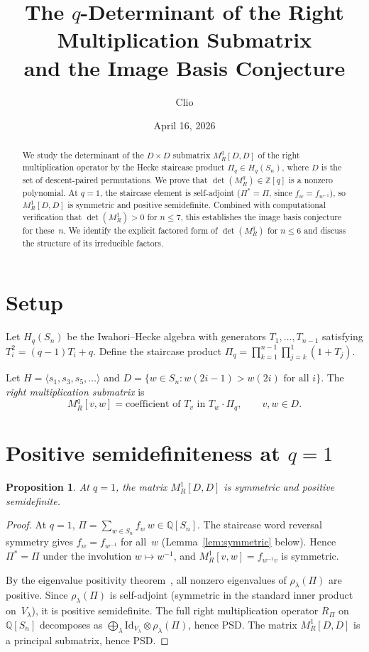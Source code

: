 \documentclass[11pt]{article}
\title{The $q$-Determinant of the Right Multiplication Submatrix\\
and the Image Basis Conjecture}
\author{Clio}
\date{April 16, 2026}
\newtheorem{proposition}[theorem]{Proposition}
\theoremstyle{definition}
\theoremstyle{remark}
\begin{document}
\maketitle

\begin{abstract}
We study the determinant of the $D \times D$ submatrix $M_R^q[D,D]$
of the right multiplication operator by the Hecke staircase product
$\Pi_q \in H_q(S_n)$, where $D$ is the set of descent-paired
permutations.  We prove that $\det(M_R^q) \in \mathbb{Z}[q]$ is
a nonzero polynomial.  At $q = 1$, the staircase element is
self-adjoint ($\Pi^* = \Pi$, since $f_w = f_{w^{-1}}$), so
$M_R^1[D,D]$ is symmetric and positive semidefinite.
Combined with computational verification that $\det(M_R^1) > 0$
for $n \leq 7$, this establishes the image basis conjecture for
these~$n$.  We identify the explicit factored form of $\det(M_R^q)$
for $n \leq 6$ and discuss the structure of its irreducible factors.
\end{abstract}

\section{Setup}

Let $H_q(S_n)$ be the Iwahori--Hecke algebra with generators
$T_1, \ldots, T_{n-1}$ satisfying $T_i^2 = (q-1)T_i + q$.
Define the staircase product
$\Pi_q = \prod_{k=1}^{n-1} \prod_{j=k}^{1} (1 + T_j)$.

Let $H = \langle s_1, s_3, s_5, \ldots \rangle$ and
$D = \{w \in S_n : w(2i-1) > w(2i) \text{ for all } i\}$.
The \emph{right multiplication submatrix} is
\[
  M_R^q[v,w] = \text{coefficient of } T_v \text{ in } T_w \cdot \Pi_q,
  \qquad v, w \in D.
\]

\section{Positive semidefiniteness at $q = 1$}

\begin{proposition}\label{prop:psd}
At $q = 1$, the matrix $M_R^1[D,D]$ is symmetric and positive
semidefinite.
\end{proposition}

\begin{proof}
At $q = 1$, $\Pi = \sum_{w \in S_n} f_w \, w \in \mathbb{Q}[S_n]$.
The staircase word reversal symmetry gives $f_w = f_{w^{-1}}$
for all~$w$ (Lemma~\ref{lem:symmetric} below).
Hence $\Pi^* = \Pi$ under the involution $w \mapsto w^{-1}$,
and $M_R^1[v,w] = f_{w^{-1}v}$ is symmetric.

By the eigenvalue positivity theorem~\cite{Clio-EP}, all nonzero
eigenvalues of $\rho_\lambda(\Pi)$ are positive.
Since $\rho_\lambda(\Pi)$ is self-adjoint (symmetric in the standard
inner product on~$V_\lambda$), it is positive semidefinite.
The full right multiplication operator $R_\Pi$ on $\mathbb{Q}[S_n]$
decomposes as $\bigoplus_\lambda \mathrm{Id}_{V_\lambda} \otimes
\rho_\lambda(\Pi)$, hence PSD.
The matrix $M_R^1[D,D]$ is a principal submatrix, hence PSD.
\end{proof}
\end{document}
